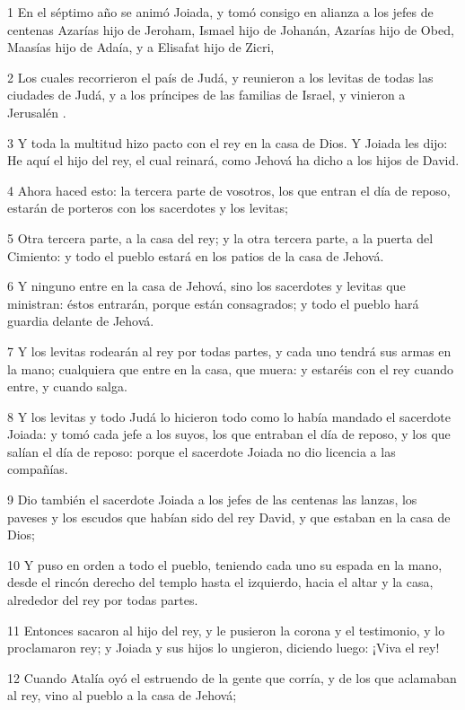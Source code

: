 \par 1 En el séptimo año se animó Joiada, y tomó consigo en alianza a los jefes de centenas Azarías hijo de Jeroham, Ismael hijo de Johanán,  Azarías hijo de Obed, Maasías hijo de Adaía, y a Elisafat hijo de Zicri,
\par 2 Los cuales recorrieron el país de Judá, y reunieron a los levitas de todas las ciudades de Judá, y a los príncipes de las familias de Israel, y vinieron a Jerusalén .
\par 3 Y toda la multitud hizo pacto con el rey en la casa de Dios. Y Joiada les dijo: He aquí el hijo del rey, el cual reinará, como Jehová ha dicho a los hijos de David.
\par 4 Ahora haced esto: la tercera parte de vosotros, los que entran el día de reposo, estarán de porteros con los sacerdotes y los levitas;
\par 5 Otra tercera parte, a la casa del rey; y la otra tercera parte, a la puerta del Cimiento: y todo el pueblo estará en los patios de la casa de Jehová.
\par 6 Y ninguno entre en la casa de Jehová, sino los sacerdotes y levitas que ministran: éstos entrarán, porque están consagrados; y todo el pueblo hará guardia delante de Jehová.
\par 7 Y los levitas rodearán al rey por todas partes, y cada uno tendrá sus armas en la mano;  cualquiera que entre en la casa, que muera: y estaréis con el rey cuando entre, y cuando salga.
\par 8 Y los levitas y todo Judá lo hicieron todo como lo había mandado el sacerdote Joiada: y tomó cada jefe a los suyos, los que entraban el día de reposo, y los que salían el día de reposo: porque el sacerdote Joiada no dio licencia a las compañías.
\par 9 Dio también el sacerdote Joiada a los jefes de las centenas las lanzas, los paveses y los escudos que habían sido del rey David, y que estaban en la casa de Dios;
\par 10 Y puso en orden a todo el pueblo, teniendo cada uno su espada en la mano, desde el rincón derecho del templo hasta el izquierdo, hacia el altar y la casa, alrededor del rey por todas partes.
\par 11 Entonces sacaron al hijo del rey, y le pusieron la corona y el testimonio, y lo proclamaron rey; y Joiada y sus hijos lo ungieron, diciendo luego: ¡Viva el rey!
\par 12 Cuando Atalía oyó el estruendo de la gente que corría, y de los que aclamaban al rey, vino al pueblo a la casa de Jehová;
